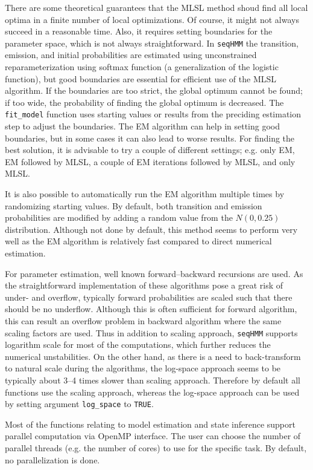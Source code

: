 \documentclass[12pt]{article}\usepackage[]{graphicx}\usepackage[]{color}
\begin{document}
There are some theoretical guarantees that the MLSL method shoud find all local optima in a finite number of local optimizations. Of course, it might not always succeed in a reasonable time. Also, it requires setting boundaries for the parameter space, which is not always straightforward. In \texttt{seqHMM} the transition, emission, and initial probabilities are estimated using unconstrained reparameterization using softmax function (a generalization of the logistic function), but good boundaries are essential for efficient use of the MLSL algorithm. If the boundaries are too strict, the global optimum cannot be found; if too wide, the probability of finding the global optimum is decreased. The \texttt{fit\_model} function uses starting values or results from the preciding estimation step to adjust the boundaries. The EM algorithm can help in setting good boundaries, but in some cases it can also lead to worse results. For finding the best solution, it is advisable to try a couple of different settings; e.g. only EM, EM followed by MLSL, a couple of EM iterations followed by MLSL, and only MLSL.

It is also possible to automatically run the EM algorithm multiple times by randomizing starting values. By default, both transition and emission probabilities are modified by adding a random value from the $N(0, 0.25)$ distribution. Although not done by default, this method seems to perform very well as the EM algorithm is relatively fast compared to direct numerical estimation.

For parameter estimation, well known forward--backward recursions are used. As the straightforward implementation of these algorithms pose a great risk of under- and overflow, typically forward probabilities are scaled such that there should be no underflow. Although this is often sufficient for forward algorithm, this can result an overflow problem in backward algorithm where the same scaling factors are used. Thus in addition to scaling approach, \texttt{seqHMM} supports logarithm scale for most of the computations, which further reduces the numerical unstabilities. On the other hand, as there is a need to back-transform to natural scale during the algorithms, the log-space approach seems to be typically about 3--4 times slower than scaling approach. Therefore by default all functions use the scaling approach, whereas the log-space approach can be used by setting argument \texttt{log\_space} to \texttt{TRUE}.

Most of the functions relating to model estimation and state inference support parallel computation via OpenMP interface. The user can choose the number of parallel threads (e.g. the number of cores) to use for the specific task. By default, no parallelization is done.
\end{document}

